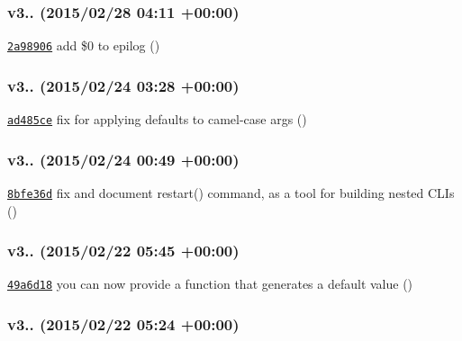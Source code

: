 \subsubsection*{v3.. (2015/02/28 04\+:11 +00\+:00)}


\begin{DoxyItemize}
\item \href{https://github.com/bcoe/yargs/commit/2a9890675821c0e7a12f146ce008b0562cb8ec9a}{\tt 2a98906} add \$0 to epilog ()
\end{DoxyItemize}

\subsubsection*{v3.. (2015/02/24 03\+:28 +00\+:00)}


\begin{DoxyItemize}
\item \href{https://github.com/bcoe/yargs/commit/ad485ce748ebdfce25b88ef9d6e83d97a2f68987}{\tt ad485ce} fix for applying defaults to camel-\/case args ()
\end{DoxyItemize}

\subsubsection*{v3.. (2015/02/24 00\+:49 +00\+:00)}


\begin{DoxyItemize}
\item \href{https://github.com/bcoe/yargs/commit/8bfe36d7fb0f93a799ea3f4c756a7467c320f8c0}{\tt 8bfe36d} fix and document restart() command, as a tool for building nested C\+L\+Is ()
\end{DoxyItemize}

\subsubsection*{v3.. (2015/02/22 05\+:45 +00\+:00)}


\begin{DoxyItemize}
\item \href{https://github.com/bcoe/yargs/commit/49a6d1822a4ef9b1ea6f90cc366be60912628885}{\tt 49a6d18} you can now provide a function that generates a default value ()
\end{DoxyItemize}

\subsubsection*{v3.. (2015/02/22 05\+:24 +00\+:00)}


